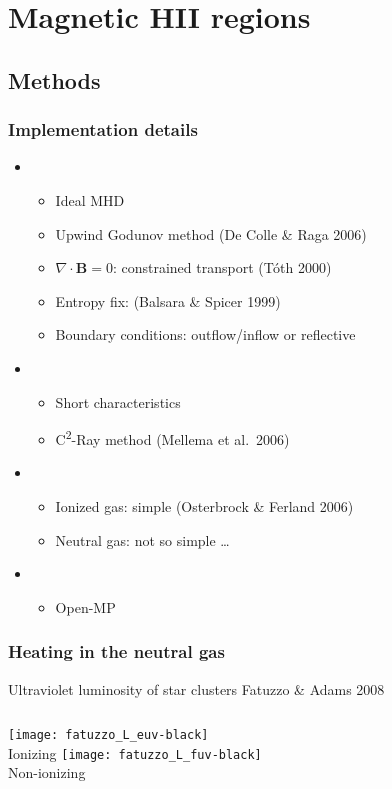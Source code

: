 \documentclass{beamer}
\newcommand\Ref[1]{\textcolor{white!70!black!90!yellow}{#1}}
\begin{document}
\section{Magnetic HII regions}

\subsection{Methods}

\begin{frame}
  \frametitle{Implementation details}
  \begin{itemize}
  \item {}
    \begin{itemize}
    \item Ideal MHD
    \item Upwind Godunov method \Ref{(De Colle \& Raga 2006)}
    \item \(\nabla \cdot \mathbf{B} = 0\): constrained transport \Ref{(Tóth 2000)}
    \item Entropy fix: \Ref{(Balsara \& Spicer 1999)}
    \item Boundary conditions: outflow/inflow or reflective
    \end{itemize}
  \item {}
    \begin{itemize}
    \item Short characteristics
    \item C\textsuperscript{2}-Ray method \Ref{(Mellema et al.\ 2006)}
    \end{itemize}
  \item {}
    \begin{itemize}
    \item Ionized gas: simple \Ref{(Osterbrock \& Ferland 2006)}
    \item Neutral gas: not so simple \dots
    \end{itemize}
  \item {}
    \begin{itemize}
    \item Open-MP
    \end{itemize}
  \end{itemize}
\end{frame}


\begin{frame}
  \frametitle{Heating in the neutral gas}
  \begin{block}{Ultraviolet luminosity of star clusters}
    \centering
    \Ref{Fatuzzo \& Adams 2008}\medskip
    \begin{columns}
      \centering
      \texttt{[image: fatuzzo\_L\_euv-black]}\\
      Ionizing
      \centering
      \texttt{[image: fatuzzo\_L\_fuv-black]}\\
      Non-ionizing
    \end{columns}
  \end{block}
\end{frame}
\end{document}
